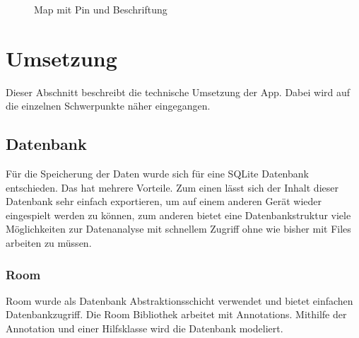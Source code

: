 \documentclass[
    DIV12,
    cleardouble=plain,
    headings=normal,
    pdftex,
    headexclude,footexclude,
    final
]{scrreprt}
\begin{document}
\begin{figure}[H]
	\centering
	\caption{Map mit Pin und Beschriftung}
	\label{Map mit Pin und Beschriftung}
\end{figure}



\chapter{Umsetzung}
Dieser Abschnitt beschreibt die technische Umsetzung der App. Dabei wird auf die einzelnen Schwerpunkte näher eingegangen.
\section{Datenbank}
	Für die Speicherung der Daten wurde sich für eine SQLite Datenbank entschieden. Das hat mehrere Vorteile. Zum einen lässt sich der Inhalt dieser Datenbank sehr einfach exportieren, um auf einem anderen Gerät wieder eingespielt werden zu können, zum anderen bietet eine Datenbankstruktur viele Möglichkeiten zur Datenanalyse mit schnellem Zugriff ohne wie bisher mit Files arbeiten zu müssen.

\subsection{Room}
Room wurde als Datenbank Abstraktionsschicht verwendet und bietet einfachen Datenbankzugriff. Die Room Bibliothek arbeitet mit Annotations. Mithilfe der Annotation und einer Hilfsklasse wird die Datenbank modeliert. 

\newpage
\end{document}
